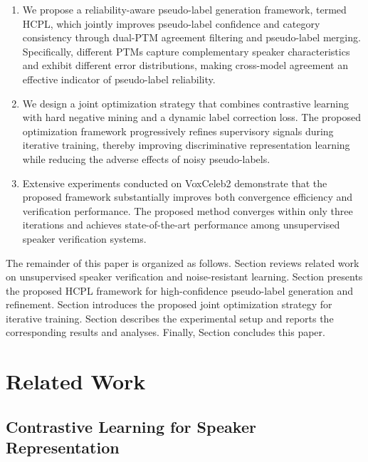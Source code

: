 \documentclass[lettersize,journal]{IEEEtran}
\begin{document}
\begin{enumerate}
    \item We propose a reliability-aware pseudo-label generation framework, termed HCPL, which jointly improves pseudo-label confidence and category consistency through dual-PTM agreement filtering and pseudo-label merging. Specifically, different PTMs capture complementary speaker characteristics and exhibit different error distributions, making cross-model agreement an effective indicator of pseudo-label reliability.

    \item We design a joint optimization strategy that combines contrastive learning with hard negative mining and a dynamic label correction loss. The proposed optimization framework progressively refines supervisory signals during iterative training, thereby improving discriminative representation learning while reducing the adverse effects of noisy pseudo-labels.

    \item Extensive experiments conducted on VoxCeleb2 demonstrate that the proposed framework substantially improves both convergence efficiency and verification performance. The proposed method converges within only three iterations and achieves state-of-the-art performance among unsupervised speaker verification systems.
\end{enumerate}

The remainder of this paper is organized as follows. Section \uppercase\expandafter{} reviews related work on unsupervised speaker verification and noise-resistant learning. Section \uppercase\expandafter{} presents the proposed HCPL framework for high-confidence pseudo-label generation and refinement. Section \uppercase\expandafter{} introduces the proposed joint optimization strategy for iterative training. Section \uppercase\expandafter{} describes the experimental setup and reports the corresponding results and analyses. Finally, Section \uppercase\expandafter{} concludes this paper.

\section{Related Work}

\subsection{Contrastive Learning for Speaker Representation}
\end{document}

